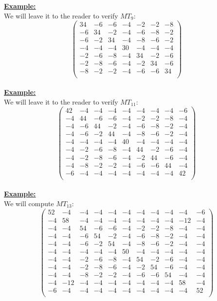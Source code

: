 \documentclass[11pt]{article}
\theoremstyle{plain}
\theoremstyle{definition}
\begin{document}
\textbf{\underline{Example:}} \\
We will leave it to the reader to verify $MT_9$:
\[\left(
\begin{array}{ccccccc}
	34 & -6 & -6 & -4 & -2 & -2 & -8 \\
	-6 & 34 & -2 & -4 & -6 & -8 & -2 \\
	-6 & -2 & 34 & -4 & -8 & -6 & -2 \\
	-4 & -4 & -4 & 30 & -4 & -4 & -4 \\
	-2 & -6 & -8 & -4 & 34 & -2 & -6 \\
	-2 & -8 & -6 & -4 & -2 & 34 & -6 \\
	-8 & -2 & -2 & -4 & -6 & -6 & 34 \\
\end{array}
\right)\]
\\
\textbf{\underline{Example:}} \\
We will leave it to the reader to verify $MT_{11}$:
\[\left(
\begin{array}{ccccccccc}
	42 & -4 & -4 & -4 & -4 & -4 & -4 & -4 & -6 \\
	-4 & 44 & -6 & -6 & -4 & -2 & -2 & -8 & -4 \\
	-4 & -6 & 44 & -2 & -4 & -6 & -8 & -2 & -4 \\
	-4 & -6 & -2 & 44 & -4 & -8 & -6 & -2 & -4 \\
	-4 & -4 & -4 & -4 & 40 & -4 & -4 & -4 & -4 \\
	-4 & -2 & -6 & -8 & -4 & 44 & -2 & -6 & -4 \\
	-4 & -2 & -8 & -6 & -4 & -2 & 44 & -6 & -4 \\
	-4 & -8 & -2 & -2 & -4 & -6 & -6 & 44 & -4 \\
	-6 & -4 & -4 & -4 & -4 & -4 & -4 & -4 & 42 \\
\end{array}
\right)\]
\\
\textbf{\underline{Example:}} \\
We will compute $MT_{13}$:
\[\left(
\begin{array}{ccccccccccc}
	52 & -4 & -4 & -4 & -4 & -4 & -4 & -4 & -4 & -4 & -6 \\
	-4 & 58 & -4 & -4 & -4 & -4 & -4 & -4 & -4 & -12 & -4 \\
	-4 & -4 & 54 & -6 & -6 & -4 & -2 & -2 & -8 & -4 & -4 \\
	-4 & -4 & -6 & 54 & -2 & -4 & -6 & -8 & -2 & -4 & -4 \\
	-4 & -4 & -6 & -2 & 54 & -4 & -8 & -6 & -2 & -4 & -4 \\
	-4 & -4 & -4 & -4 & -4 & 50 & -4 & -4 & -4 & -4 & -4 \\
	-4 & -4 & -2 & -6 & -8 & -4 & 54 & -2 & -6 & -4 & -4 \\
	-4 & -4 & -2 & -8 & -6 & -4 & -2 & 54 & -6 & -4 & -4 \\
	-4 & -4 & -8 & -2 & -2 & -4 & -6 & -6 & 54 & -4 & -4 \\
	-4 & -12 & -4 & -4 & -4 & -4 & -4 & -4 & -4 & 58 & -4 \\
	-6 & -4 & -4 & -4 & -4 & -4 & -4 & -4 & -4 & -4 & 52 \\
\end{array}
\right)\]
\end{document}
